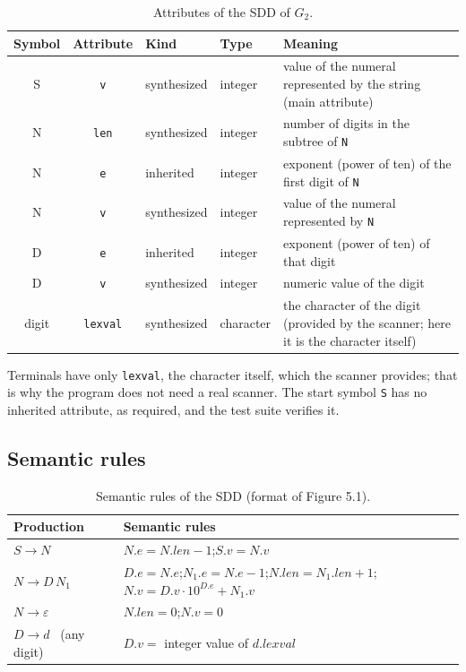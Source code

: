 \documentclass[11pt,letterpaper]{article}
\newcommand{\nt}[1]{\texttt{#1}}
\newcommand{\attr}[1]{\texttt{#1}}
\begin{document}
\begin{table}[H]
\centering
\small
\caption{Attributes of the SDD of $G_2$.}
\label{tab:atributos}
\begin{tabularx}{\textwidth}{@{}c c l l >{\raggedright\arraybackslash}X@{}}
\toprule
\textbf{Symbol} & \textbf{Attribute} & \textbf{Kind} & \textbf{Type} & \textbf{Meaning}\\
\midrule
S & \attr{v} & synthesized & integer & value of the numeral represented by the string (main attribute)\\
N & \attr{len} & synthesized & integer & number of digits in the subtree of \nt{N}\\
N & \attr{e} & inherited & integer & exponent (power of ten) of the first digit of \nt{N}\\
N & \attr{v} & synthesized & integer & value of the numeral represented by \nt{N}\\
D & \attr{e} & inherited & integer & exponent (power of ten) of that digit\\
D & \attr{v} & synthesized & integer & numeric value of the digit\\
digit & \attr{lexval} & synthesized & character & the character of the digit (provided by the scanner; here it is the character itself)\\
\bottomrule
\end{tabularx}
\end{table}

Terminals have only \attr{lexval}, the character itself, which the scanner provides; that is why the
program does not need a real scanner. The start symbol \nt{S} has no inherited attribute, as
required, and the test suite verifies it.

\subsection{Semantic rules}

\begin{table}[H]
\centering
\small
\caption{Semantic rules of the SDD (format of Figure 5.1).}
\label{tab:reglas}
\begin{tabularx}{\textwidth}{@{}l >{\raggedright\arraybackslash}X@{}}
\toprule
\textbf{Production} & \textbf{Semantic rules}\\
\midrule
$S \to N$ & $N.e = N.len - 1$;\quad $S.v = N.v$\\
$N \to D\,N_1$ & $D.e = N.e$;\quad $N_1.e = N.e - 1$;\quad $N.len = N_1.len + 1$;\quad
$N.v = D.v \cdot 10^{D.e} + N_1.v$\\
$N \to \varepsilon$ & $N.len = 0$;\quad $N.v = 0$\\
$D \to d$ \ (any digit) & $D.v = $ integer value of $d.lexval$\\
\bottomrule
\end{tabularx}
\end{table}
\end{document}
